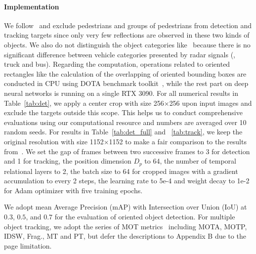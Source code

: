 \documentclass[10pt,twocolumn,letterpaper]{article}
\begin{document}
\vspace{-5mm}
\paragraph{Implementation} We follow~\cite{sheeny2020radiate} and exclude pedestrians and groups of pedestrians from detection and tracking targets since only very few reflections are observed in these two kinds of objects. We also do not distinguish the object categories like~\cite{sheeny2020radiate} because there is no significant difference between vehicle categories presented by radar signals (\eg, truck and bus). Regarding the computation, operations related to oriented rectangles like the calculation of the overlapping of oriented bounding boxes are conducted in CPU using DOTA benchmark toolkit~\cite{xia2018dota}, while the rest part on deep neural networks is running on a single RTX 3090. For all numerical results in Table~\ref{tab:det}, we apply a center crop with size 256$\times$256 upon input images and exclude the targets outside this scope. This helps us to conduct comprehensive evaluations using our computational resource and numbers are averaged over 10 random seeds. For results in Table~\ref{tab:det_full} and ~\ref{tab:track}, we keep the original resolution with size 1152$\times$1152 to make a fair comparison to the results from~\cite{sheeny2020radiate}. We set the gap of frames between two successive frames to 3 for detection and 1 for tracking, the position dimension $D_p$ to 64, the number of temporal relational layers to 2, the batch size to 64 for cropped images with a gradient accumulation to every 2 steps, the learning rate to 5e-4 and weight decay to 1e-2 for Adam optimizer with five training epochs.

We adopt mean Average Precision (mAP) with Intersection over Union (IoU) at $0.3$, $0.5$, and $0.7$ for the evaluation of oriented object detection. For multiple object tracking, we adopt the series of MOT metrics~\cite{milan2016mot16} including MOTA, MOTP, IDSW, Frag., MT and PT, but defer the descriptions to Appendix B due to the page limitation.
\end{document}

